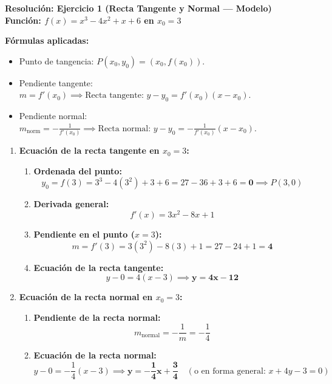 \documentclass[11pt,a4paper]{article}
\begin{document}
\pagestyle{empty}

\begin{center}
    {\LARGE \textbf{Resolución: Ejercicio 1 (Recta Tangente y Normal — Modelo)}}\\[4pt]
    {\large \textbf{Función: $f(x) = x^3 - 4x^2 + x + 6$ en $x_0 = 3$}}
\end{center}

\vspace{0.3cm}
\begin{tcolorbox}
\textbf{Fórmulas aplicadas:}
\begin{itemize}[leftmargin=1.5em, itemsep=2pt]
    \item Punto de tangencia: $P(x_0, y_0) = (x_0, f(x_0))$.
    \item Pendiente tangente: $m = f'(x_0) \implies \text{Recta tangente: } y - y_0 = f'(x_0)(x - x_0)$.
    \item Pendiente normal: $m_{\text{norm}} = -\frac{1}{f'(x_0)} \implies \text{Recta normal: } y - y_0 = -\frac{1}{f'(x_0)}(x - x_0)$.
\end{itemize}
\end{tcolorbox}

\vspace{0.2cm}
\begin{enumerate}[label=\textbf{\alph*)}, leftmargin=2em, itemsep=8pt]
    \item \textbf{Ecuación de la recta tangente en $x_0 = 3$:}
    \begin{enumerate}[label=\arabic*., leftmargin=1.5em, itemsep=2pt]
        \item \textbf{Ordenada del punto:}
        \[
        y_0 = f(3) = 3^3 - 4(3^2) + 3 + 6 = 27 - 36 + 3 + 6 = \mathbf{0} \implies P(3, 0)
        \]
        \item \textbf{Derivada general:}
        \[
        f'(x) = 3x^2 - 8x + 1
        \]
        \item \textbf{Pendiente en el punto ($x = 3$):}
        \[
        m = f'(3) = 3(3^2) - 8(3) + 1 = 27 - 24 + 1 = \mathbf{4}
        \]
        \item \textbf{Ecuación de la recta tangente:}
        \[
        y - 0 = 4(x - 3) \implies \mathbf{y = 4x - 12}
        \]
    \end{enumerate}

    \item \textbf{Ecuación de la recta normal en $x_0 = 3$:}
    \begin{enumerate}[label=\arabic*., leftmargin=1.5em, itemsep=2pt]
        \item \textbf{Pendiente de la recta normal:}
        \[
        m_{\text{normal}} = -\frac{1}{m} = -\frac{1}{4}
        \]
        \item \textbf{Ecuación de la recta normal:}
        \[
        y - 0 = -\frac{1}{4}(x - 3) \implies \mathbf{y = -\frac{1}{4}x + \frac{3}{4}} \quad (\text{o en forma general: } x + 4y - 3 = 0)
        \]
    \end{enumerate}
\end{enumerate}
\end{document}

